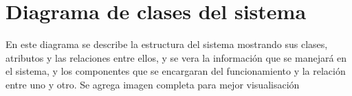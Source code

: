 \documentclass[12pt]{article}
\begin{document}



\section{Diagrama de clases del sistema}
En este diagrama se describe la estructura del sistema mostrando sus clases, atributos y las relaciones entre ellos, y se vera la informaci\'on que se manejar\'a en el sistema, y los componentes que se encargaran del funcionamiento y la relaci\'on entre uno y otro.
Se agrega imagen completa para mejor visualisaci\'on
\end{document}

